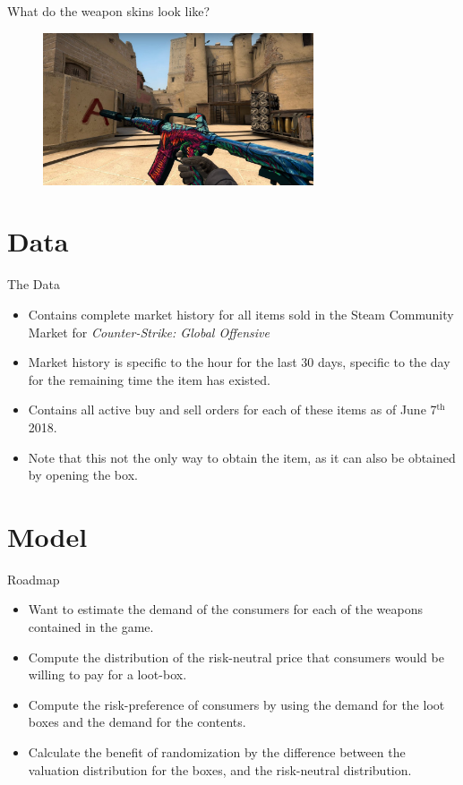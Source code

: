 \documentclass[bigger]{beamer}
\begin{document}
\begin{frame}[label={sec:orgb7280d7}]{What do the weapon skins look like?}
\begin{figure}[H]
  \centering
  \includegraphics[width=8cm]{hyperBeast.jpg}
\end{figure}
\end{frame}


\section{Data}
\label{sec:org637e455}
\begin{frame}[label={sec:orge2612e9}]{The Data}
\begin{itemize}
\item Contains complete market history for all items sold in the Steam
Community Market for \emph{Counter-Strike: Global Offensive}
\item Market history is specific to the hour for the last 30 days,
specific to the day for the remaining time the item has existed.
\item Contains all active buy and sell orders for each of these items as
of June 7\(^{\text{th}}\) 2018.
\item Note that this not the only way to obtain the item, as it can also
be obtained by opening the box.
\end{itemize}
\end{frame}



\section{Model}
\label{sec:orgdba4b2f}
\begin{frame}[label={sec:org21a6ba3}]{Roadmap}
\begin{itemize}
\item Want to estimate the demand of the consumers for each of the
weapons contained in the game.
\item Compute the distribution of the risk-neutral price that consumers
would be willing to pay for a loot-box.
\item Compute the risk-preference of consumers by using the demand for the
loot boxes and the demand for the contents.
\item Calculate the benefit of randomization by the difference between the
valuation distribution for the boxes, and the risk-neutral distribution.
\end{itemize}
\end{frame}
\end{document}
